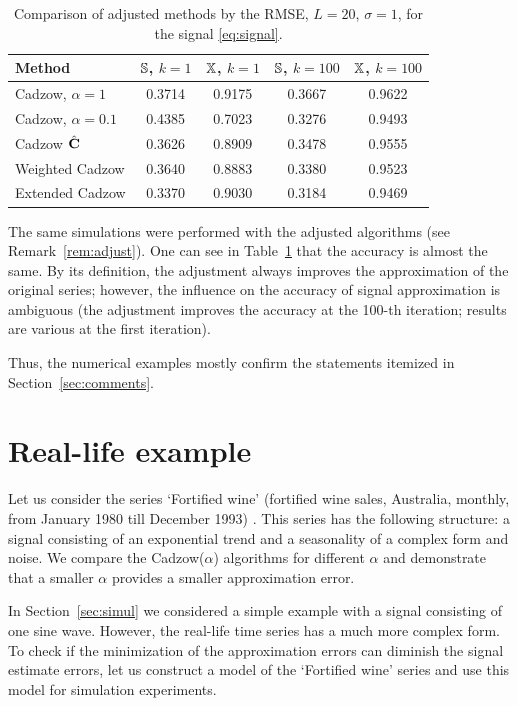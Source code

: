 \documentclass[sii]{ipart}
\begin{document}
\begin{table}
	\begin{center}
		\caption{Comparison of adjusted methods by the RMSE, $L = 20$, $\sigma=1$, for the signal \eqref{eq:signal}.}\label{fintable_improved}
		\begin{tabular*}{\textwidth}{@{\extracolsep{\fill}}lcccc}
			\hline
			Method & $\mathbb{S}$, $k = 1$ & $\mathbb{X}$, $k = 1$ & $\mathbb{S}$, $k = 100$ & $\mathbb{X}$, $k = 100$  \\
			\hline
			Cadzow, $\alpha = 1$ & 0.3714 & 0.9175 & 0.3667 & 0.9622 \\
			\hline
			Cadzow, $\alpha = 0.1$ & 0.4385 & 0.7023 & 0.3276 & 0.9493 \\
			\hline
			Cadzow $\hat{\mathbf{C}}$ & 0.3626 & 0.8909 & 0.3478 & 0.9555 \\
			\hline
			Weighted Cadzow & 0.3640 & 0.8883 & 0.3380 & 0.9523 \\
			\hline
			Extended Cadzow & 0.3370 & 0.9030 & 0.3184 & 0.9469 \\
			\hline
		\end{tabular*}
	\end{center}
\end{table}


The same simulations were performed with the adjusted algorithms (see Remark~\ref{rem:adjust}). One can see in Table~\ref{fintable_improved} that the accuracy is almost the same. By its definition, the adjustment always improves the approximation of the original series; however, the influence on the accuracy of signal approximation is ambiguous (the adjustment improves the accuracy at the 100-th iteration; results are various at the first iteration).


Thus, the numerical examples mostly confirm the statements itemized in Section~\ref{sec:comments}.

\section{Real-life example}
\label{sec:ex_real}
Let us consider the series `Fortified wine' (fortified wine sales, Australia, monthly, from January 1980 till December 1993) \citep{HyndmanTSDL}. This series has the following structure: a signal consisting of an exponential trend and a seasonality of a complex form and noise.
We compare the Cadzow($\alpha$) algorithms for different $\alpha$ and demonstrate that a smaller $\alpha$ provides
a smaller approximation error.

In Section~\ref{sec:simul} we considered a simple example with a signal consisting of one sine wave.
However, the real-life time series has a much more complex form. To check if the minimization of 
the approximation errors can diminish the signal estimate errors,
let us construct a model of the `Fortified wine' series and use this model for simulation experiments.
\end{document}
